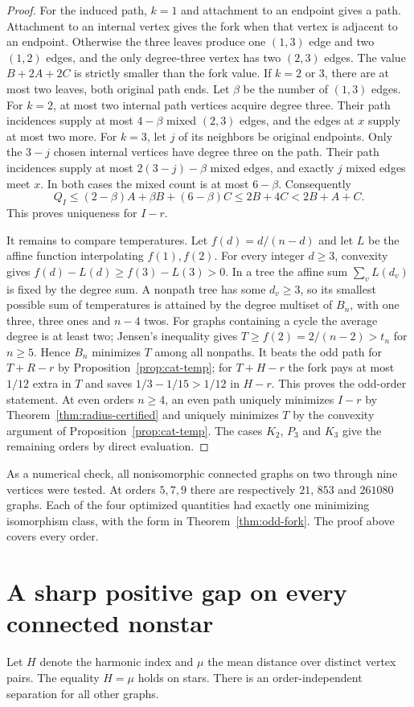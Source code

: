 \documentclass[11pt,a4paper]{article}
\begin{document}
\begin{proof}
For the induced path, $k=1$ and attachment to an endpoint gives a path.
Attachment to an internal vertex gives the fork when that vertex is
adjacent to an endpoint. Otherwise the three leaves produce one
$(1,3)$ edge and two $(1,2)$ edges, and the only degree-three vertex
has two $(2,3)$ edges. The value $B+2A+2C$ is strictly smaller than
the fork value. If $k=2$ or $3$, there are at most two leaves, both
original path ends. Let $\beta$ be the number of $(1,3)$ edges.
For $k=2$, at most two internal path vertices acquire degree three.
Their path incidences supply at most $4-\beta$ mixed $(2,3)$ edges,
and the edges at $x$ supply at most two more.
For $k=3$, let $j$ of its neighbors be original endpoints.
Only the $3-j$ chosen internal vertices have degree three on the path.
Their path incidences supply at most $2(3-j)-\beta$ mixed edges, and
exactly $j$ mixed edges meet $x$. In both cases the mixed count is
at most $6-\beta$. Consequently
\[
 Q_I\le (2-\beta)A+\beta B+(6-\beta)C
       \le 2B+4C<2B+A+C .
\]
This proves uniqueness for $I-r$.

It remains to compare temperatures. Let $f(d)=d/(n-d)$ and let $L$ be
the affine function interpolating $f(1),f(2)$. For every integer
$d\ge3$, convexity gives $f(d)-L(d)\ge f(3)-L(3)>0$.
In a tree the affine sum $\sum_v L(d_v)$ is fixed by the degree sum.
A nonpath tree has some $d_v\ge3$, so its smallest possible sum of
temperatures is attained by the degree multiset of $B_n$, with one
three, three ones and $n-4$ twos. For graphs containing a cycle
the average degree is at least two; Jensen's inequality gives
$T\ge f(2)=2/(n-2)>t_n$ for $n\ge5$.
Hence $B_n$ minimizes $T$ among all nonpaths. It beats the odd path for
$T+R-r$ by Proposition~\ref{prop:cat-temp}; for $T+H-r$ the fork pays
at most $1/12$ extra in $T$ and saves $1/3-1/15>1/12$ in $H-r$.
This proves the odd-order statement. At even orders $n\ge4$, an
even path uniquely minimizes $I-r$ by Theorem~\ref{thm:radius-certified}
and uniquely minimizes $T$ by the convexity argument of
Proposition~\ref{prop:cat-temp}. The cases $K_2$, $P_3$ and $K_3$
give the remaining orders by direct evaluation.
\end{proof}
As a numerical check, all nonisomorphic connected graphs on two through
nine vertices were tested. At orders $5,7,9$ there are respectively
$21$, $853$ and $261080$ graphs. Each of the four optimized quantities
had exactly one minimizing isomorphism class, with the form in
Theorem~\ref{thm:odd-fork}. The proof above covers every order.

\section{A sharp positive gap on every connected nonstar}\label{sec:sixth}
\begingroup\setlength{\emergencystretch}{2em}
Let $H$ denote the harmonic index and $\mu$ the mean distance over distinct vertex pairs. The equality $H=\mu$ holds on stars. There is an order-independent separation for all other graphs.
\end{document}
